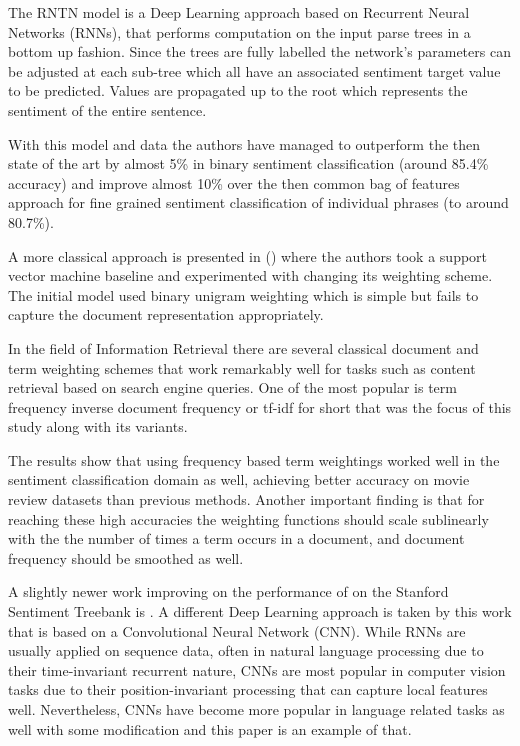 \documentclass{article}
\begin{document}
The RNTN model is a Deep Learning approach based on Recurrent Neural Networks (RNNs), that performs computation on the input parse trees in a bottom up fashion. Since the trees are fully labelled the network's parameters can be adjusted at each sub-tree which all have an associated sentiment target value to be predicted. Values are propagated up to the root which represents the sentiment of the entire sentence.

With this model and data the authors have managed to outperform the then state of the art by almost 5\% in binary sentiment classification (around 85.4\% accuracy) and improve almost 10\% over the then common bag of features approach for fine grained sentiment classification of individual phrases (to around 80.7\%).

A more classical approach is presented in (\cite{paltoglou2010study}) where the authors took a support vector machine baseline and experimented with changing its weighting scheme. The initial model used binary unigram weighting which is simple but fails to capture the document representation appropriately.

In the field of Information Retrieval there are several classical document and term weighting schemes that work remarkably well for tasks such as content retrieval based on search engine queries. One of the most popular is term frequency inverse document frequency or tf-idf for short that was the focus of this study along with its variants.

The results show that using frequency based term weightings worked well in the sentiment classification domain as well, achieving better accuracy on movie review datasets than previous methods. Another important finding is that for reaching these high accuracies the weighting functions should scale sublinearly with the the number of times a term occurs in a document, and document frequency should be smoothed as well.

A slightly newer work improving on the performance of \cite{socher2013recursive} on the Stanford Sentiment Treebank is \cite{dos2014deep}. A different Deep Learning approach is taken by this work that is based on a Convolutional Neural Network (CNN). While RNNs are usually applied on sequence data, often in natural language processing due to their time-invariant recurrent nature, CNNs are most popular in computer vision tasks due to their position-invariant processing that can capture local features well. Nevertheless, CNNs have become more popular in language related tasks as well with some modification and this paper is an example of that.
\end{document}
